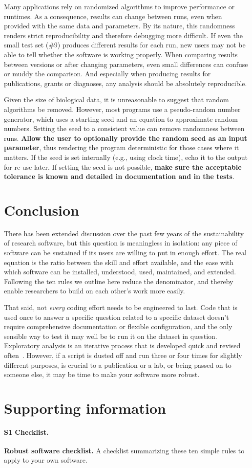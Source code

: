 \documentclass[10pt,letterpaper]{article}
\newcommand{\ruleminor}[1]{\textbf{#1}}
\begin{document}
Many applications rely on randomized algorithms to improve performance
or runtimes. As a consequence, results can change between runs, even
when provided with the same data and parameters. By its nature, this
randomness renders strict reproducibility and therefore debugging more
difficult. If even the small test set (\#9) produces different results
for each run, new users may not be able to tell whether the software
is working properly. When comparing results between versions or after
changing parameters, even small differences can confuse or muddy the
comparison. And especially when producing results for publications,
grants or diagnoses, any analysis should be absolutely reproducible.

Given the size of biological data, it is unreasonable to suggest that
random algorithms be removed. However, most programs use a
pseudo-random number generator, which uses a starting seed and an
equation to approximate random numbers. Setting the seed to a
consistent value can remove randomness between runs. \ruleminor{Allow
the user to optionally provide the random seed as an input
parameter}, thus rendering the program deterministic for those cases
where it matters. If the seed is set internally (e.g., using clock
time), echo it to the output for re-use later.  If setting the seed is
not possible, \ruleminor{make sure the acceptable tolerance is known
and detailed in documentation and in the tests}.

\section*{Conclusion}

There has been extended discussion over the past few years of the
sustainability of research software, but this question is meaningless
in isolation: any piece of software can be sustained if its users are
willing to put in enough effort.  The real equation is the ratio
between the skill and effort available, and the ease with which
software can be installed, understood, used, maintained, and extended.
Following the ten rules we outline here reduce the denominator, and
thereby enable researchers to build on each other's work more easily.

That said, not \emph{every} coding effort needs to be engineered to
last.  Code that is used once to answer a specific question related to
a specific dataset doesn't require comprehensive documentation or
flexible configuration, and the only sensible way to test it may well
be to run it on the dataset in question. Exploratory analysis is an
iterative process that is developed quick and revised
often~\cite{lawlor2015,sanders2008}.  However, if a script is dusted
off and run three or four times for slightly different purposes, is
crucial to a publication or a lab, or being passed on to someone else,
it may be time to make your software more robust.

\section*{Supporting information}

\paragraph*{S1 Checklist.}
\label{S1_Checklist}
{\bf Robust software checklist.} A checklist summarizing these ten simple rules
to apply to your own software.


\end{document}
